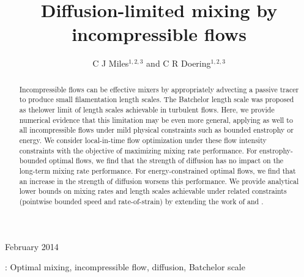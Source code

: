 \documentclass[12pt]{iopart}
\begin{document}
\title[Diffusion-limited mixing by incompressible flows]{Diffusion-limited mixing by incompressible flows}

\author{C J Miles$^{1,2,3}$ and C R Doering$^{1,2,3}$ }

\address{$^1$ Department of Physics, University of Michigan,
Ann Arbor, MI 48104-1040, USA}
\address{$^2$ Department of Mathematics, University of Michigan,
Ann Arbor, MI 48104-1043, USA}
\address{$^3$ Center for the Study of Complex Systems, University of Michigan,
Ann Arbor, MI 48104-1107, USA}
\vspace{10pt}
\begin{indented}
\item[]February 2014
\end{indented}

\begin{abstract}
Incompressible flows can be effective mixers by appropriately advecting a passive tracer to produce small filamentation length scales. The Batchelor length scale \cite{Batchelor1959a} was proposed as thelower limit of length scales achievable in turbulent flows. Here, we provide numerical evidence that this limitation may be even more general, applying as well to all incompressible flows under mild physical constraints such as bounded enstrophy or energy. We consider local-in-time flow optimization under these flow intensity constraints with the objective of maximizing mixing rate performance. For enstrophy-bounded optimal flows, we find that the strength of diffusion has no impact on the long-term mixing rate performance. For energy-constrained optimal flows, we find that an increase in the strength of diffusion worsens this performance. We provide analytical lower bounds on mixing rates and length scales achievable under related constraints (pointwise bounded speed and rate-of-strain) by extending the work of \cite{JFM2011} and \cite{Chi-Cheu1996}. 

\end{abstract}

%
\vspace{2pc}
: Optimal mixing, incompressible flow, diffusion, Batchelor scale

\submitto{\NL}
%
% 
%
\end{document}
